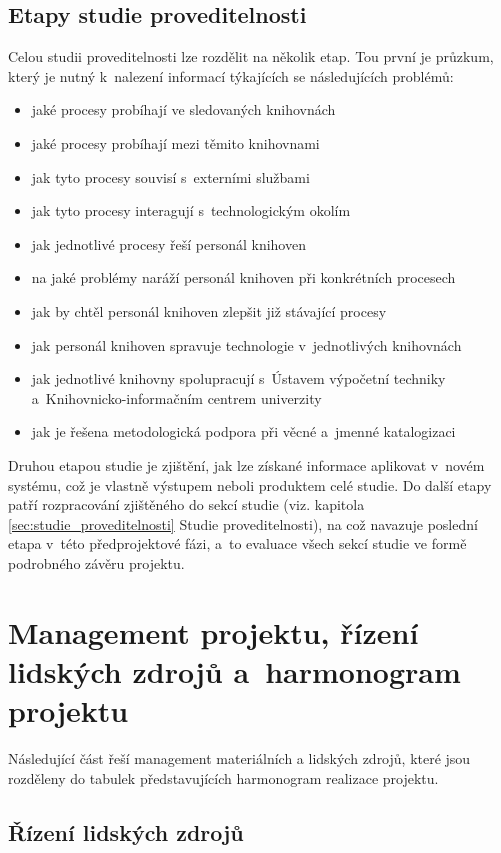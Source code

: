 \documentclass[
	11pt, oneside, printed, final, palatino, monochrome
	microtype,
	table,   %
	lof,     %
	lot     %
]{fithesis3}
\begin{document}
{\subsection{Etapy studie proveditelnosti}

Celou studii proveditelnosti lze rozdělit na několik etap. Tou první je průzkum, který je nutný k~nalezení informací týkajících se následujících problémů:

\begin{itemize}
\item jaké procesy probíhají ve sledovaných knihovnách
\item jaké procesy probíhají mezi těmito knihovnami
\item jak tyto procesy souvisí s~externími službami
\item jak tyto procesy interagují s~technologickým okolím
\item jak jednotlivé procesy řeší personál knihoven
\item na jaké problémy naráží personál knihoven při konkrétních procesech
\item jak by chtěl personál knihoven zlepšit již stávající procesy
\item jak personál knihoven spravuje technologie v~jednotlivých knihovnách
\item jak jednotlivé knihovny spolupracují s~Ústavem výpočetní techniky a~Knihovnicko-informačním centrem univerzity
\item jak je řešena metodologická podpora při věcné a~jmenné katalogizaci
\end{itemize}

Druhou etapou studie je zjištění, jak lze získané informace aplikovat v~novém systému, což je vlastně výstupem neboli produktem celé studie. Do další etapy patří rozpracování zjištěného do sekcí studie (viz. kapitola \ref{sec:studie_proveditelnosti} Studie proveditelnosti), na což navazuje poslední etapa v~této předprojektové fázi, a~to evaluace všech sekcí studie ve formě podrobného závěru projektu.

\section{Management projektu, řízení lidských zdrojů a~harmonogram projektu}

Následující část řeší management materiálních a lidských zdrojů, které jsou rozděleny do tabulek představujících harmonogram realizace projektu.

\subsection{Řízení lidských zdrojů}

}
\end{document}
